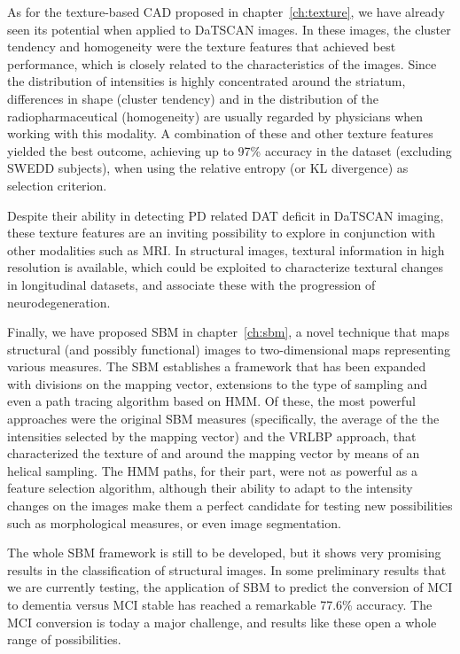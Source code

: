 As for the texture-based \ac{CAD} proposed in chapter~\ref{ch:texture}, we have already seen its potential when applied to DaTSCAN images. In these images, the cluster tendency and homogeneity were the texture features that achieved best performance, which is closely related to the characteristics of the images. Since the distribution of intensities is highly concentrated around the striatum, differences in shape (cluster tendency) and in the distribution of the radiopharmaceutical (homogeneity) are usually regarded by physicians when working with this modality. A combination of these and other texture features yielded the best outcome, achieving up to 97\% accuracy in the \ppmidat{} dataset (excluding \ac{SWEDD} subjects), when using the relative entropy (or \ac{KL} divergence) as selection criterion. 

Despite their ability in detecting \ac{PD} related \ac{DAT} deficit in DaTSCAN imaging, these texture features are an inviting possibility to explore in conjunction with other modalities such as \ac{MRI}. In structural images, textural information in high resolution is available, which could be exploited to characterize textural changes in longitudinal datasets, and associate these with the progression of neurodegeneration. 

Finally, we have proposed \ac{SBM} in chapter~\ref{ch:sbm}, a novel technique that maps structural (and possibly functional) images to two-dimensional maps representing various measures. The \ac{SBM} establishes a framework that has been expanded with divisions on the mapping vector, extensions to the type of sampling and even a path tracing algorithm based on \ac{HMM}. Of these, the most powerful approaches were the original \ac{SBM} measures (specifically, the average of the the intensities selected by the mapping vector) and the \ac{VRLBP} approach, that characterized the texture of and around the mapping vector by means of an helical sampling. The \ac{HMM} paths, for their part, were not as powerful as a feature selection algorithm, although their ability to adapt to the intensity changes on the images make them a perfect candidate for testing new possibilities such as morphological measures, or even image segmentation. 

The whole \ac{SBM} framework is still to be developed, but it shows very promising results in the classification of structural images. In some preliminary results that we are currently testing, the application of \ac{SBM} to predict the conversion of \ac{MCI} to dementia versus \ac{MCI} stable has reached a remarkable 77.6\% accuracy. The \ac{MCI} conversion is today a major challenge, and results like these open a whole range of possibilities. 

